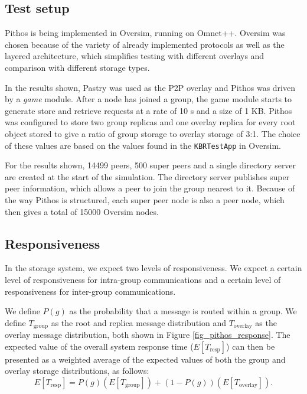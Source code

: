 \documentclass[10pt,a4paper,conference]{IEEEtran}
\begin{document}
\subsection{Test setup}
\label{test_setup}

Pithos is being implemented in Oversim, running on Omnet++. Oversim was chosen because of the variety of already implemented protocols as well as the
layered architecture, which simplifies testing with different overlays and comparison with different storage types.

In the results shown, Pastry was used as the P2P overlay and Pithos was driven by a \emph{game} module. After a node has joined a group, the game
module starts to generate store and retrieve requests at a rate of 10 s and a size of 1 KB. Pithos was configured to store two group replicas and one
overlay replica for every root object stored to give a ratio of group storage to overlay storage of 3:1. The choice of these values are based on the
values found in the \verb.KBRTestApp. in Oversim.

For the results shown, 14499 peers, 500 super peers and a single directory server are created at the start of the simulation. The directory server
publishes super peer information, which allows a peer to join the group nearest to it. Because of the way Pithos is structured, each super peer node
is also a peer node, which then gives a total of 15000 Oversim nodes.

\subsection{Responsiveness}

In the storage system, we expect two levels of responsiveness. We expect a certain level of responsiveness for intra-group communications and a
certain level of responsiveness for inter-group communications.


We define $P(g)$ as the probability that a message is routed within a group. We define $T_{\textrm{group}}$ as the root and replica message
distribution and $T_{\textrm{overlay}}$ as the overlay message distribution, both shown in Figure \ref{fig_pithos_response}. The expected value of
the overall system response time ($E[T_{\textrm{resp}}]$) can then be presented as a weighted average of the expected values of both the group and
overlay storage distributions, as follows:
%
\begin{equation}\label{expected_response_time}
    E[T_{\textrm{resp}}] = P(g)\left(E\left[T_{\textrm{group}}\right]\right) + \left(1 - P(g)\right)\left(E\left[T_{\textrm{overlay}}\right]\right).
\end{equation}
\end{document}
